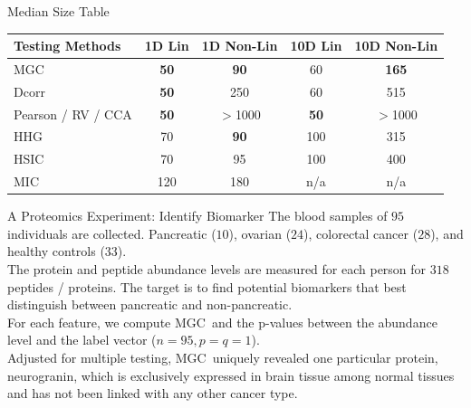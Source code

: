 \documentclass[mathserif,t]{beamer}
\newcommand{\Mgc}{MGC}
\begin{document}
\begin{frame}{Median Size Table}
\begin{tabular}{|l||c|c|c|c|}
\hline
Testing Methods & 1D Lin & 1D Non-Lin & 10D Lin & 10D Non-Lin   \\
\hline
 \textcolor{UniOrange}{MGC}  & \textbf{50}  & \textbf{90} & 60 & \textbf{165} \\
\hline 
 Dcorr & \textbf{50}  & 250 & 60 & 515 \\
\hline
Pearson / RV / CCA & \textbf{50}  & $>$1000 & \textbf{50} & $>$1000 \\
\hline
 HHG & 70  & \textbf{90} & 100 & 315  \\
\hline
HSIC & 70  & 95 & 100 & 400 \\
\hline
MIC & 120  & 180 & n/a & n/a \\
\hline
\end{tabular}
\end{frame}

\begin{frame}{A Proteomics Experiment: Identify Biomarker}
\pause
The blood samples of $95$ individuals are collected. Pancreatic ($10$), ovarian ($24$), colorectal cancer ($28$), and healthy controls ($33$). \\

\pause
\medskip
The protein and peptide abundance levels are measured for each person for $318$ peptides / proteins. 
\pause
The target is to find potential biomarkers that best distinguish between pancreatic and non-pancreatic.\\

\pause
\medskip
For each feature, we compute \Mgc~and the p-values between the abundance level and the label vector ($n=95, p=q=1$).\\

\pause
\medskip
Adjusted for multiple testing, \Mgc~uniquely revealed one particular protein, neurogranin, which is exclusively expressed in brain tissue among normal tissues and has not been linked with any other cancer type. \\

\end{frame}
\end{document}
